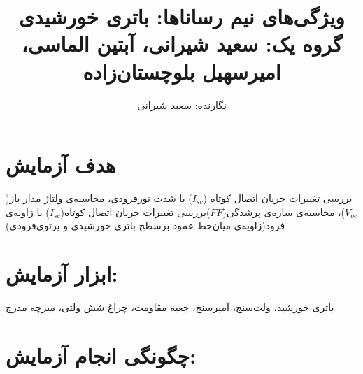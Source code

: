 \documentclass{article}
\begin{document}
	
	\title {ویژگی‌های نیم رساناها: باتری‌ خورشیدی\\
			\vspace{0.5cm}
			\large گروه یک: سعید شیرانی، آبتین الماسی، امیرسهیل بلوچستان‌زاده\\}
	
	\author{نگارنده: سعید شیرانی} 
	
	\affil{ }
	\maketitle
	\newpage{}
	\normalsize 
	
	\section{هدف آزمایش}
	\vspace{5mm}
	\normalsize
	
	بررسی تغییرات جریان اتصال کوتاه ($I_{sc}$) با شدت نور‌فرودی، محاسبه‌ی ولتاژ مدار باز($V_{oc}$)، محاسبه‌ی سازه‌ی پرشدگی($FF$)بررسی تغییرات جریان اتصال کوتاه($I_{sc}$) با زاویه‌‌ی فرود(زاویه‌ی میان‌خط عمود برسطح باتری خورشیدی و پرتوی‌فرودی)
	
\section{ابزار آزمایش:}
باتری خورشید، ولت‌سنج، آمپرسنج، جعبه مقاومت، چراغ شش ولتی، میزچه مدرج
\section{چگونگی انجام آزمایش:}
\end{document}
